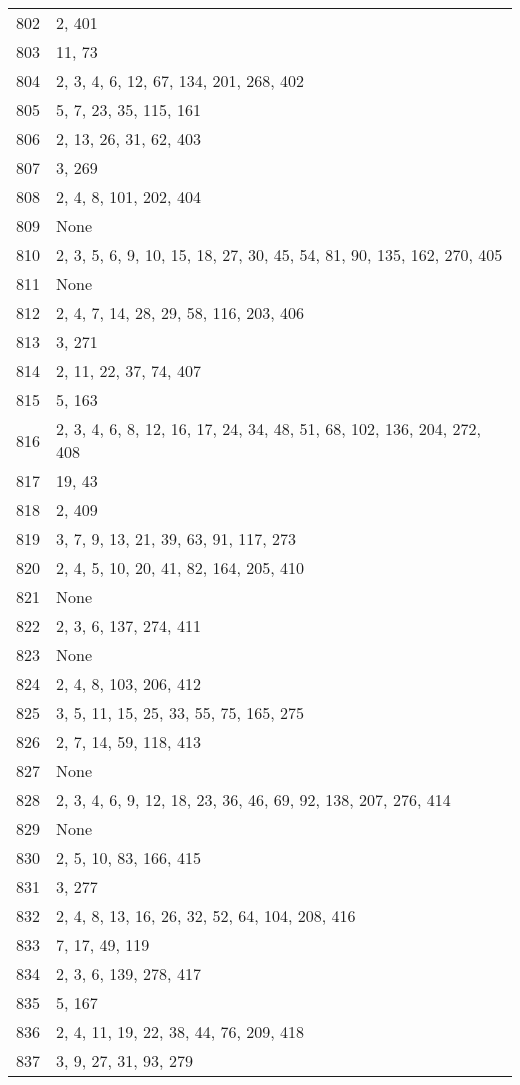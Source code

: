 \documentclass[12pt]{article}
\begin{document}
\begin{tabular}{|r|l|}
802 & 2, 401 \\ 
803 & 11, 73 \\ 
804 & 2, 3, 4, 6, 12, 67, 134, 201, 268, 402 \\ 
805 & 5, 7, 23, 35, 115, 161 \\ 
806 & 2, 13, 26, 31, 62, 403 \\ 
807 & 3, 269 \\ 
808 & 2, 4, 8, 101, 202, 404 \\ 
809 & None \\ 
810 & 2, 3, 5, 6, 9, 10, 15, 18, 27, 30, 45, 54, 81,  90, 135, 162, 270, 405 \\ 
811 & None \\ 
812 & 2, 4, 7, 14, 28, 29, 58, 116, 203, 406 \\ 
813 & 3, 271 \\ 
814 & 2, 11, 22, 37, 74, 407 \\ 
815 & 5, 163 \\ 
816 & 2, 3, 4, 6, 8, 12, 16, 17, 24, 34, 48, 51, 68, 102, 136, 204, 272, 408 \\ 
817 & 19, 43 \\ 
818 & 2, 409 \\ 
819 & 3, 7, 9, 13, 21, 39, 63, 91, 117, 273 \\ 
820 & 2, 4, 5, 10, 20, 41, 82, 164, 205, 410 \\ 
821 & None \\ 
822 & 2, 3, 6, 137, 274, 411 \\ 
823 & None \\ 
824 & 2, 4, 8, 103, 206, 412 \\ 
825 & 3, 5, 11, 15, 25, 33, 55, 75, 165, 275 \\ 
826 & 2, 7, 14, 59, 118, 413 \\ 
827 & None \\ 
828 & 2, 3, 4, 6, 9, 12, 18, 23, 36, 46, 69, 92, 138, 207, 276, 414 \\ 
829 & None \\ 
830 & 2, 5, 10, 83, 166, 415 \\ 
831 & 3, 277 \\ 
832 & 2, 4, 8, 13, 16, 26, 32, 52, 64, 104,  208, 416 \\ 
833 & 7, 17, 49, 119 \\ 
834 & 2, 3, 6, 139, 278, 417 \\ 
835 & 5, 167 \\ 
836 & 2, 4, 11, 19, 22, 38, 44, 76, 209, 418 \\ 
837 & 3, 9, 27, 31, 93, 279 \\ 

\end{tabular}
\end{document}
